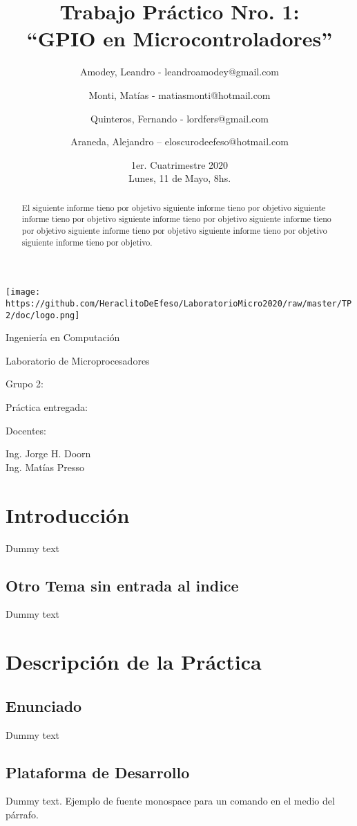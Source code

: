 \documentclass{article}
\title{Trabajo Práctico Nro. 1:\\“GPIO en Microcontroladores”}
\author{Amodey, Leandro - leandroamodey@gmail.com
\and Monti, Matías - matiasmonti@hotmail.com
\and Quinteros, Fernando - lordfers@gmail.com
\and Araneda, Alejandro – eloscurodeefeso@hotmail.com}
\date{1er. Cuatrimestre 2020\\Lunes, 11 de Mayo, 8hs.}
\def\teacher{Ing. Jorge H. Doorn\\Ing. Matías Presso}
\begin{document}
\begin{titlepage}
\makeatletter
\centering
\texttt{[image: https://github.com/HeraclitoDeEfeso/LaboratorioMicro2020/raw/master/TP2/doc/logo.png]}\par
{\Large Ingeniería en Computación \par}
\vspace{0.5cm}
{\LARGE Laboratorio de Microprocesadores \par}
\vfill
{\huge \@title \par}
\vfill
Grupo 2:\par
\begin{center}
{\renewcommand{\and}{\par}\@author}    
\end{center}
\vfill
Práctica entregada:\par
\@date
\vfill
Docentes:\par
\teacher
\vspace{1cm}
\makeatother
\end{titlepage}

\renewcommand{\abstractname}{Resumen}
\begin{abstract}
El siguiente informe tieno por objetivo siguiente informe tieno por objetivo siguiente informe tieno por objetivo siguiente informe tieno por objetivo siguiente informe tieno por objetivo siguiente informe tieno por objetivo siguiente informe tieno por objetivo siguiente informe tieno por objetivo.
\end{abstract}

\section{Introducción}
Dummy text

\subsection*{Otro Tema sin entrada al indice}
Dummy text

\section{Descripción de la Práctica}

\subsection{Enunciado}
Dummy text

\subsection{Plataforma de Desarrollo}
Dummy text. Ejemplo de fuente monospace {\ttfamily para un comando} en el medio del párrafo.
\end{document}
